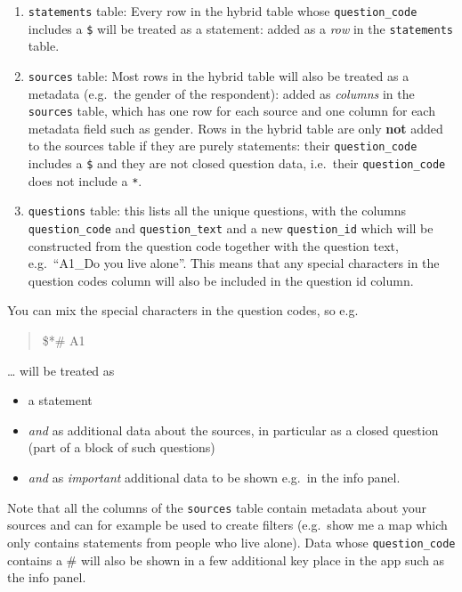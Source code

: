 \documentclass[
]{book}
\providecommand{\tightlist}{%
  \setlength{\itemsep}{0pt}\setlength{\parskip}{0pt}}
\begin{document}
\begin{enumerate}
\def\labelenumi{\arabic{enumi})}
\item
  \texttt{statements} table: Every row in the hybrid table whose \texttt{question\_code} includes a \texttt{\$} will be treated as a statement: added as a \emph{row} in the \texttt{statements} table.
\item
  \texttt{sources} table: Most rows in the hybrid table will also be treated as a metadata (e.g.~the gender of the respondent): added as \emph{columns} in the \texttt{sources} table, which has one row for each source and one column for each metadata field such as gender. Rows in the hybrid table are only \textbf{not} added to the sources table if they are purely statements: their \texttt{question\_code} includes a \texttt{\$} and they are not closed question data, i.e.~their \texttt{question\_code} does not include a \texttt{*}.\\
\item
  \texttt{questions} table: this lists all the unique questions, with the columns \texttt{question\_code} and \texttt{question\_text} and a new \texttt{question\_id} which will be constructed from the question code together with the question text, e.g.~``A1\_Do you live alone''. This means that any special characters in the question codes column will also be included in the question id column.
\end{enumerate}

You can mix the special characters in the question codes, so e.g.

\begin{quote}
\$*\# A1
\end{quote}

\ldots{} will be treated as

\begin{itemize}
\tightlist
\item
  a statement
\item
  \emph{and} as additional data about the sources, in particular as a closed question (part of a block of such questions)
\item
  \emph{and} as \emph{important} additional data to be shown e.g.~in the info panel.
\end{itemize}

Note that all the columns of the \texttt{sources} table contain metadata about your sources and can for example be used to create filters (e.g.~show me a map which only contains statements from people who live alone). Data whose \texttt{question\_code} contains a \# will also be shown in a few additional key place in the app such as the info panel.
\end{document}
